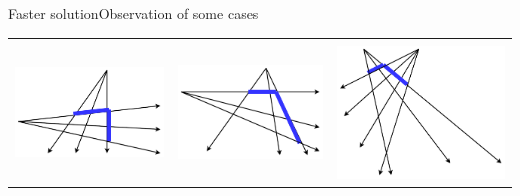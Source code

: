 \documentclass{beamer}
\begin{document}
\begin{frame}{Faster solution}{Observation of some cases}
\begin{tabular}{c c c}
\begin{minipage}{0.3\textwidth}
        \end{minipage} \\
        \begin{minipage}{0.3\textwidth}
            \includegraphics[width=\linewidth]{example4.pdf}
        \end{minipage} 
        & 
        \begin{minipage}{0.3\textwidth}
            \includegraphics[width=\linewidth]{example5.pdf}
        \end{minipage} 
        &
        \begin{minipage}{0.3\textwidth}
            \includegraphics[width=\linewidth]{example6.pdf}

\end{minipage}
\end{tabular}
\end{frame}
\end{document}
